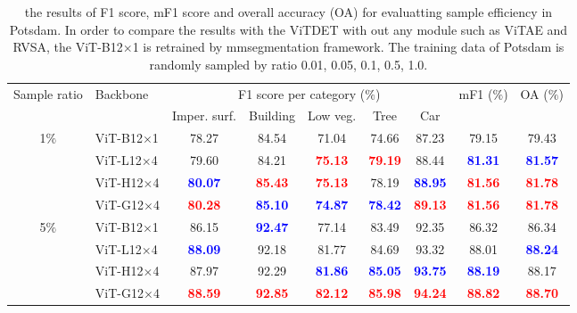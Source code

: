 \begin{table*}[ht]{\textwidth=0mm}
    \centering
    \caption{the results of F1 score, mF1 score and overall accuracy (OA) for evaluatting sample efficiency in Potsdam. In order to compare the results with the ViTDET with out any module such as ViTAE and RVSA, the ViT-B12$\times$1 is retrained by mmsegmentation framework. The training data of Potsdam is randomly sampled by ratio 0.01, 0.05, 0.1, 0.5, 1.0.}
    \renewcommand{\arraystretch}{1.25}
    {
    \begin{tabular}{c | l | c c c c c | c | c }
        \hline

        \multirow{2}{*}{Sample ratio} & \multirow{2}{*}{Backbone} & \multicolumn{5}{c|}{F1 score per category ($\%$)} & \multirow{2}{*}{mF1 ($\%$)} & \multirow{2}{*}{OA ($\%$)} \\ \cline{3-7}
         &  & Imper. surf. & Building & Low veg. & Tree & Car & & \\ \hline

        \multirow{4}{*}{1$\%$} & ViT-B12$\times$1\cite{wang2022advancing} & 78.27 & 84.54 & 71.04 & 74.66 & 87.23 & 79.15 & 79.43 \\
        & ViT-L12$\times$4 & 79.60 & 84.21 & \textbf{\textcolor{red}{75.13}} & \textbf{\textcolor{red}{79.19}} & 88.44 & \textbf{\textcolor{blue}{81.31}} & \textbf{\textcolor{blue}{81.57}} \\
        & ViT-H12$\times$4 & \textbf{\textcolor{blue}{80.07}} & \textbf{\textcolor{red}{85.43}} & \textbf{\textcolor{red}{75.13}} & 78.19 & \textbf{\textcolor{blue}{88.95}} & \textbf{\textcolor{red}{81.56}} & \textbf{\textcolor{red}{81.78}} \\
        & ViT-G12$\times$4 & \textbf{\textcolor{red}{80.28}} & \textbf{\textcolor{blue}{85.10}} & \textbf{\textcolor{blue}{74.87}} & \textbf{\textcolor{blue}{78.42}} & \textbf{\textcolor{red}{89.13}} & \textbf{\textcolor{red}{81.56}} & \textbf{\textcolor{red}{81.78}} \\ \hline

        \multirow{4}{*}{5$\%$} & ViT-B12$\times$1\cite{wang2022advancing} & 86.15 & \textbf{\textcolor{blue}{92.47}} & 77.14 & 83.49 & 92.35 & 86.32 & 86.34 \\
        & ViT-L12$\times$4 & \textbf{\textcolor{blue}{88.09}} & 92.18 & 81.77 & 84.69 & 93.32 & 88.01 & \textbf{\textcolor{blue}{88.24}} \\
        & ViT-H12$\times$4 & 87.97 & 92.29 & \textbf{\textcolor{blue}{81.86}} & \textbf{\textcolor{blue}{85.05}} & \textbf{\textcolor{blue}{93.75}} & \textbf{\textcolor{blue}{88.19}} & 88.17 \\
        & ViT-G12$\times$4 & \textbf{\textcolor{red}{88.59}} & \textbf{\textcolor{red}{92.85}} & \textbf{\textcolor{red}{82.12}} & \textbf{\textcolor{red}{85.98}} & \textbf{\textcolor{red}{94.24}} & \textbf{\textcolor{red}{88.82}} & \textbf{\textcolor{red}{88.70}} \\ \hline


\end{tabular}}
\end{table*}

